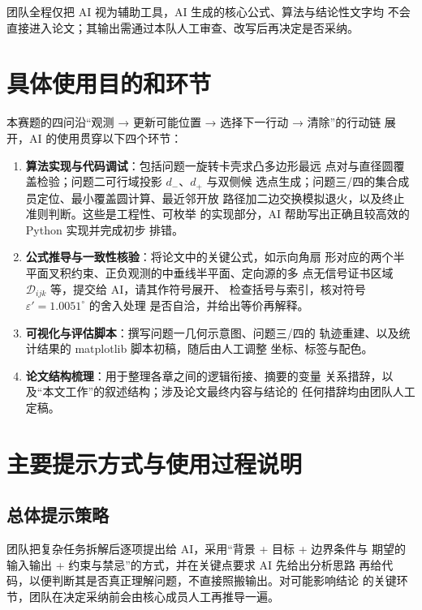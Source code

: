 \documentclass[UTF8,a4paper,12pt]{ctexart}
\begin{document}
团队全程仅把 AI 视为辅助工具，AI 生成的核心公式、算法与结论性文字均
不会直接进入论文；其输出需通过本队人工审查、改写后再决定是否采纳。

\section{具体使用目的和环节}

本赛题的四问沿“观测 → 更新可能位置 → 选择下一行动 → 清除”的行动链
展开，AI 的使用贯穿以下四个环节：

\begin{enumerate}
  \item \textbf{算法实现与代码调试}：包括问题一旋转卡壳求凸多边形最远
        点对与直径圆覆盖检验；问题二可行域投影 $d_-$、$d_+$ 与双侧候
        选点生成；问题三/四的集合成员定位、最小覆盖圆计算、最近邻开放
        路径加二边交换模拟退火，以及终止准则判断。这些是工程性、可枚举
        的实现部分，AI 帮助写出正确且较高效的 Python 实现并完成初步
        排错。
  \item \textbf{公式推导与一致性核验}：将论文中的关键公式，如示向角扇
        形对应的两个半平面叉积约束、正负观测的中垂线半平面、定向源的多
        点无信号证书区域 $\mathcal{D}_{ijk}$ 等，提交给 AI，请其作符号展开、
        检查括号与索引，核对符号 $\varepsilon'=1.0051^\circ$ 的舍入处理
        是否自洽，并给出等价再解释。
  \item \textbf{可视化与评估脚本}：撰写问题一几何示意图、问题三/四的
        轨迹重建、以及统计结果的 matplotlib 脚本初稿，随后由人工调整
        坐标、标签与配色。
  \item \textbf{论文结构梳理}：用于整理各章之间的逻辑衔接、摘要的变量
        关系措辞，以及“本文工作”的叙述结构；涉及论文最终内容与结论的
        任何措辞均由团队人工定稿。
\end{enumerate}

\section{主要提示方式与使用过程说明}

\subsection{总体提示策略}
团队把复杂任务拆解后逐项提出给 AI，采用“背景 + 目标 + 边界条件与
期望的输入输出 + 约束与禁忌”的方式，并在关键点要求 AI 先给出分析思路
再给代码，以便判断其是否真正理解问题，不直接照搬输出。对可能影响结论
的关键环节，团队在决定采纳前会由核心成员人工再推导一遍。
\end{document}

